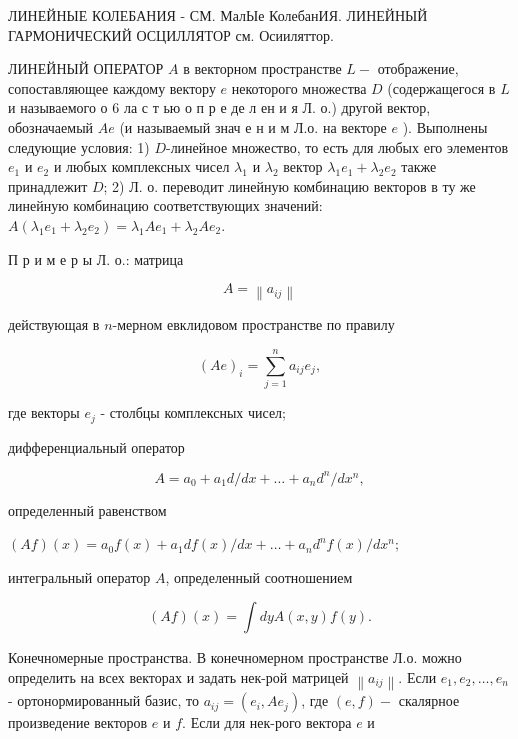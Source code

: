 \documentclass[10pt]{article}
\begin{document}
ЛИНЕЙНЫЕ КОЛЕБАНИЯ - СМ. МалЫе КолебанИЯ. ЛИНЕЙНЫЙ ГАРМОНИЧЕСКИЙ ОСЦИЛЛЯТОР см. Осииляттор.



ЛИНЕЙНЫЙ ОПЕРАТОР $A$ в векторном пространстве $L-$ отображение, сопоставляющее каждому вектору $e$ некоторого множества $D$ (содержащегося в $L$ и называемого о 6 ла с т ью о п р е де л ен и я Л. о.) другой вектор, обозначаемый $A e$ (и называемый знач е н и м Л.о. на векторе $e$ ). Выполнены следующие условия: 1) $D$-линейное множество, то есть для любых его элементов $e_{1}$ и $e_{2}$ и любых комплексных чисел $\lambda_{1}$ и $\lambda_{2}$ вектор $\lambda_{1} e_{1}+\lambda_{2} e_{2}$ также принадлежит $D$; 2) Л. о. переводит линейную комбинацию векторов в ту же линейную комбинацию соответствующих значений: $A\left(\lambda_{1} e_{1}+\lambda_{2} e_{2}\right)=\lambda_{1} A e_{1}+\lambda_{2} A e_{2}$.



П р и м е р ы Л. о.: матрица



\[

A=\left\|a_{i j}\right\|

\]



действующая в $n$-мерном евклидовом пространстве по правилу



\[

(A e)_{i}=\sum_{j=1}^{n} a_{i j} e_{j},

\]



где векторы $e_{j}$ - столбцы комплексных чисел;



дифференциальный оператор



\[

A=a_{0}+a_{1} d / d x+\ldots+a_{n} d^{n} / d x^{n},

\]



определенный равенством



$(A f)(x)=a_{0} f(x)+a_{1} d f(x) / d x+\ldots+a_{n} d^{n} f(x) / d x^{n} ;$



интегральный оператор $A$, определенный соотношением



\[

(A f)(x)=\int d y A(x, y) f(y) .

\]



Конечномерные пространства. В конечномерном пространстве Л.о. можно определить на всех векторах и задать нек-рой матрицей $\left\|a_{i j}\right\|$. Если $e_{1}, e_{2}, \ldots, e_{n}$ - ортонормированный базис, то $a_{i j}=\left(e_{i}, A e_{j}\right)$, где $(e, f)-$ скалярное произведение векторов $e$ и $f$. Если для нек-рого вектора $e$ и
\end{document}
